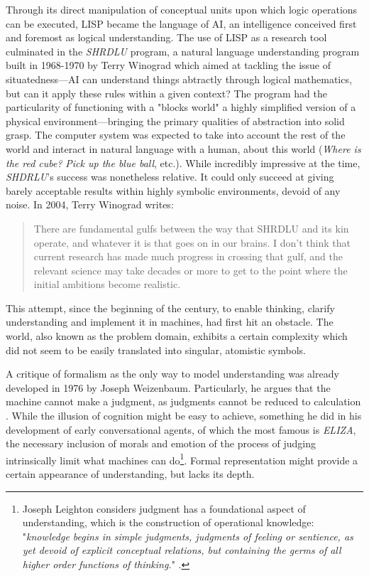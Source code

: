 Through its direct manipulation of conceptual units upon which logic operations can be executed, LISP became the language of AI, an intelligence conceived first and foremost as logical understanding. The use of LISP as a research tool culminated in the \emph{SHRDLU} program, a natural language understanding program built in 1968-1970 by Terry Winograd which aimed at tackling the issue of situatedness—AI can understand things abtractly through logical mathematics, but can it apply these rules within a given context? The program had the particularity of functioning with a "blocks world" a highly simplified version of a physical environment—bringing the primary qualities of abstraction into solid grasp. The computer system was expected to take into account the rest of the world and interact in natural language with a human, about this world (\emph{Where is the red cube?} \emph{Pick up the blue ball}, etc.). While incredibly impressive at the time, \emph{SHDRLU}'s success was nonetheless relative. It could only succeed at giving barely acceptable results within highly symbolic environments, devoid of any noise. In 2004, Terry Winograd writes:

\begin{quote}
    There are fundamental gulfs between the way that SHRDLU and its kin operate, and whatever it is that goes on in our brains. I don't think that current research has made much progress in crossing that gulf, and the relevant science may take decades or more to get to the point where the initial ambitions become realistic.  \citep{nilsson_quest_2009}
\end{quote}

This attempt, since the beginning of the century, to enable thinking, clarify understanding and implement it in machines, had first hit an obstacle. The world, also known as the problem domain, exhibits a certain complexity which did not seem to be easily translated into singular, atomistic symbols.

A critique of formalism as the only way to model understanding was already developed in 1976 by Joseph Weizenbaum. Particularly, he argues that the machine cannot make a judgment, as judgments cannot be reduced to calculation \citep{weizenbaum_computer_1976}. While the illusion of cognition might be easy to achieve, something he did in his development of early conversational agents, of which the most famous is \emph{ELIZA}, the necessary inclusion of morals and emotion of the process of judging intrinsically limit what machines can do\footnote{Joseph Leighton considers judgment has a foundational aspect of understanding, which is the construction of operational knowledge: "\emph{knowledge begins in simple judgments, judgments of feeling or sentience, as yet devoid of explicit conceptual relations, but containing the germs of all higher order functions of thinking.}" \citep{leighton_objects_1907}.}. Formal representation might provide a certain appearance of understanding, but lacks its depth.

